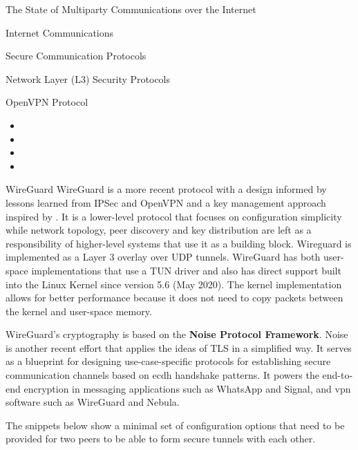 \begin{frame}[fragile]{The State of Multiparty Communications over the
Internet}
\begin{block}{Internet Communications}
\begin{block}{Secure Communication Protocols}
\begin{block}{Network Layer (L3) Security Protocols}
\begin{block}{OpenVPN Protocol}
\protect\hypertarget{openvpn-protocol}{}
\begin{itemize}
\tightlist
\item
\item
\item
\item
\end{itemize}
\end{block}

\begin{block}{WireGuard}
\protect\hypertarget{wireguard}{}
WireGuard \autocite{donenfeldWireGuardNextGeneration2017} is a more
recent protocol with a design informed by lessons learned from IPSec and
OpenVPN and a key management approach inspired by . It is a
lower-level protocol that focuses on configuration simplicity while
network topology, peer discovery and key distribution are left as a
responsibility of higher-level systems that use it as a building block.
Wireguard is implemented as a Layer 3 overlay over UDP tunnels.
WireGuard has both user-space implementations that use a TUN driver and
also has direct support built into the Linux Kernel since version 5.6
(May 2020). The kernel implementation allows for better performance
because it does not need to copy packets between the kernel and
user-space memory.

WireGuard's cryptography is based on the \textbf{Noise Protocol
Framework}\autocite{noiseDocs}. Noise is another recent effort that
applies the ideas of TLS in a simplified way. It serves as a blueprint
for designing use-case-specific protocols for establishing secure
communication channels based on \gls{ecdh} handshake patterns. It powers
the end-to-end encryption in messaging applications such as WhatsApp and
Signal, and \gls{vpn} software such as WireGuard and Nebula.
 

The snippets below show a minimal set of configuration options that need
to be provided for two peers to be able to form secure tunnels with each
other.

\begin{Shaded}
\begin{Highlighting}[]
\KeywordTok{[Interface]}
\OtherTok{=}
\OtherTok{=}\StringTok{ }
\OtherTok{=}


\end{Highlighting}
\end{Shaded}
\end{block}
\end{block}
\end{block}
\end{block}
\end{frame}
